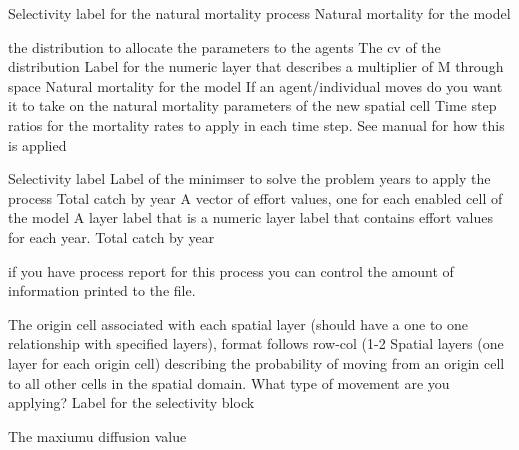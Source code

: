  {Selectivity label for the natural mortality process}
 {Natural mortality for the model}
\par\textbf{}\par
{} {the distribution to allocate the parameters to the agents}
 {The cv of the distribution}
 {Label for the numeric layer that describes a multiplier of M through space}
 {Natural mortality for the model}
 {If an agent/individual moves do you want it to take on the natural mortality parameters of the new spatial cell}
 {Time step ratios for the mortality rates to apply in each time step. See manual for how this is applied}
\par\textbf{}\par
{} {Selectivity label}
 {Label of the minimser to solve the problem}
 {years to apply the process}
 {Total catch by year}
 {A vector of effort values, one for each enabled cell of the model}
 {A layer label that is a numeric layer label that contains effort values for each year.}
 {Total catch by year}
\par\textbf{}\par
{} {if you have process report for this process you can control the amount of information printed to the file.}
\par\textbf{}\par
{} {The origin cell associated with each spatial layer (should have a one to one relationship with specified layers), format follows row-col (1-2}
 {Spatial layers (one layer for each origin cell) describing the probability of moving from an origin cell to all other cells in the spatial domain.}
 {What type of movement are you applying?}
 {Label for the selectivity block}
\par\textbf{}\par
{} {The maxiumu diffusion value}
